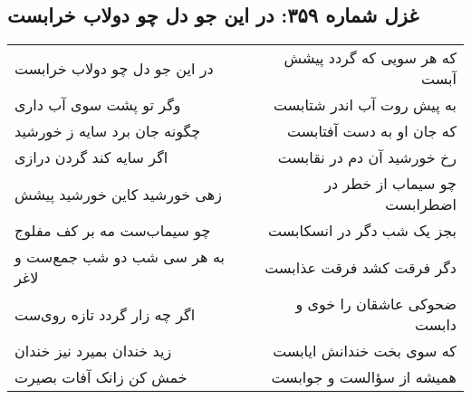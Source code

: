 \begin{center}
\section*{غزل شماره ۳۵۹: در این جو دل چو دولاب خرابست}
\label{sec:0359}
\begin{longtable}{l p{0.5cm} r}
در این جو دل چو دولاب خرابست
&&
که هر سویی که گردد پیشش آبست
\\
وگر تو پشت سوی آب داری
&&
به پیش روت آب اندر شتابست
\\
چگونه جان برد سایه ز خورشید
&&
که جان او به دست آفتابست
\\
اگر سایه کند گردن درازی
&&
رخ خورشید آن دم در نقابست
\\
زهی خورشید کاین خورشید پیشش
&&
چو سیماب از خطر در اضطرابست
\\
چو سیماب‌ست مه بر کف مفلوج
&&
بجز یک شب دگر در انسکابست
\\
به هر سی شب دو شب جمع‌ست و لاغر
&&
دگر فرقت کشد فرقت عذابست
\\
اگر چه زار گردد تازه روی‌ست
&&
ضحوکی عاشقان را خوی و دابست
\\
زید خندان بمیرد نیز خندان
&&
که سوی بخت خندانش ایابست
\\
خمش کن زانک آفات بصیرت
&&
همیشه از سؤالست و جوابست
\\
\end{longtable}
\end{center}
